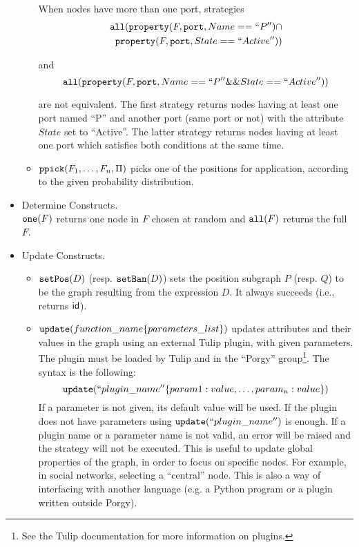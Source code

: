 \documentclass[a4paper,10pt,runningheads]{llncs}
\newcommand{\PORGY}{{\sc Porgy}\xspace}
\newcommand{\TULIP}{{\sc Tulip}\xspace}
\newcommand{\ppick}[1]{{\tt ppick(}#1{\tt )}}
\newcommand{\all}[1]{{\tt all(}#1{\tt )}}
\newcommand{\one}[1]{{\tt one(}#1{\tt )}}
\newcommand{\Id}{{\sf id}}
\newcommand{\setPos}[1]{{\tt setPos(}#1{\tt )}}
\newcommand{\setBan}[1]{{\tt setBan(}#1{\tt )}}
\newcommand{\Port}{{\tt port}}
\newcommand{\Property}[3]{{\tt property(}#1, #2, #3{\tt )}}
\newcommand{\set}[2]{{\tt update(}#1\{#2\}{\tt )}}
\begin{document}
\begin{itemize}
\begin{itemize}
 

When nodes have more than one port, strategies
\begin{equation*}
 \begin{split}
  \all{\Property{F}{\Port}{Name == ``P''}\cap \\
  \Property{F}{\Port}{State ==``Active''}}
 \end{split}
\end{equation*}
 
     and
$$\all{\Property{F}{\Port}{Name == ``P'' \&\& State ==``Active''}}$$

are not equivalent.   The first strategy returns nodes 
having at least one port named ``P'' and another port (same port or not) with the attribute 
$State$ set to ``Active''. The latter strategy returns nodes having at least one port which 
satisfies both conditions at the same time.

     
\item 
 $\ppick{F_1, \dots, F_n,\Pi}$
picks one of the positions for application, according to the given
probability distribution.

\end{itemize}

\item Determine Constructs.\\
$\one{F}$ returns one node in $F$ chosen 
at random and $\all{F}$ returns the full $F$. %


\item 
Update Constructs.\\
\begin{itemize}
\item $\setPos{D}$ (resp. $\setBan{D}$) sets the position subgraph $P$
(resp. $Q$) to be the graph resulting from the expression $D$. It
always succeeds (i.e., returns $\Id$).\\
\item $\set{function\_name}{parameters\_list}$ updates attributes and their values 
in the graph using an external \TULIP plugin, with given
parameters. The plugin must be loaded by \TULIP and in the ``\PORGY'' group\footnote{See the \TULIP documentation 
for more information on plugins.}. The 
syntax is the following: $$\set{``plugin\_name''}{param1:value, \ldots, param_n:value}$$
If a parameter is not given, its default value will be used. If the plugin does not have 
parameters using ${\tt update(}``plugin\_name''{\tt)}$ is enough. If a plugin name or a parameter name 
is not valid, an error will be raised and the strategy will not be executed.
This is useful to update global properties of the graph, 
in order to focus on specific nodes. For example, in social networks, 
selecting a ``central'' node.
This is also a way of interfacing with another language (e.g. a Python program or
a plugin written outside \PORGY).
\end{itemize}
\end{itemize}
\end{document}

